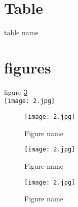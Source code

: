 \documentclass[letterpaper,12pt,onecolumn]{article}
\begin{document}
\section{Table}

\begin{table}[t]
\centering
\caption{table name\label{tab:1}}
\end{table}
\section{figures}
figure \ref{fig:1}
\blindtext\\
\noindent\texttt{[image: 2.jpg]}\\
\blindtext

\begin{figure}[ht]
\centering
\texttt{[image: 2.jpg]}
\caption{Figure name\label{fig:1}}
\end{figure}
\blindtext
\begin{figure}
\texttt{[image: 2.jpg]}
\caption{Figure name\label{fig:1}}
\end{figure}
\blindtext
\blindtext
\begin{figure}
\begin{center}
\texttt{[image: 2.jpg]}
\caption{Figure name\label{fig:1}}
\end{center}
\end{figure}
\blindtext
%
\end{document}
